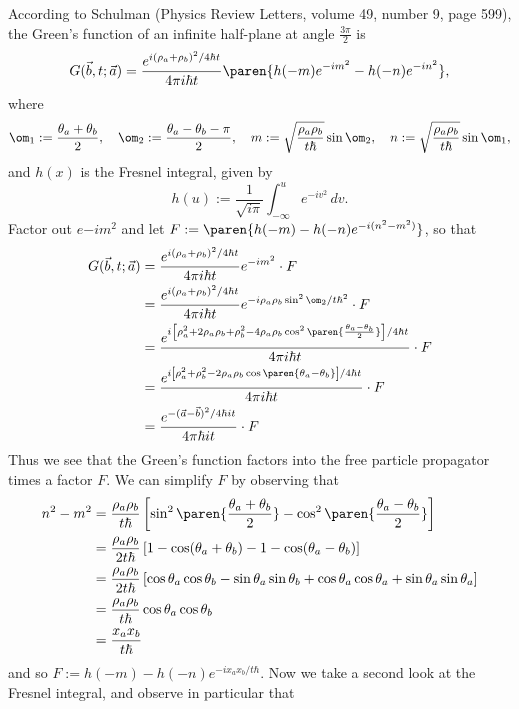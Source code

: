 \documentclass[onecolumn,amsmath,amssymb,nofootinbib,floatfix]{revtex4}
\begin{document}
According to Schulman (Physics Review Letters, volume 49, number 9, page 599), the Green's function of an infinite half-plane at angle $\frac{3\pi}{2}$ is
$$G(\vec{b},t;\vec{a}) = \frac{e^{i(\rho_a+\rho_b)^2/4\hbar t}}{4\pi i \hbar t}\paren{h(-m)e^{-im^2} - h(-n)e^{-in^2}},$$
where
$$\om_1 := \frac{\theta_a+\theta_b}{2}, \quad \om_2 := \frac{\theta_a - \theta_b - \pi}{2}, \quad m := \sqrt{\frac{\rho_a\rho_b}{t\hbar}}\sin \om_2, \quad n :=\sqrt{\frac{\rho_a\rho_b}{t\hbar}}\sin \om_1,$$
and $h(x)$ is the Fresnel integral, given by
$$h(u) := \frac{1}{\sqrt{i\pi}} \int_{-\infty}^{u} e^{-iv^2}\,dv.$$
Factor out $e{-im^2}$ and let $F:= \paren{h(-m) - h(-n)e^{-i(n^2-m^2)}}$, so that
$$
\begin{aligned}
G(\vec{b},t;\vec{a})
&= \frac{e^{i(\rho_a+\rho_b)^2/4\hbar t}}{4\pi i \hbar t}e^{-im^2}\cdot F \\
&= \frac{e^{i(\rho_a+\rho_b)^2/4\hbar t}}{4\pi i \hbar t}e^{-i\rho_a\rho_b\sin^2\om_2/t\hbar^2}\cdot F \\
&= \frac{e^{i\left[\rho_a^2+2\rho_a\rho_b+\rho_b^2-4\rho_a\rho_b\cos^2\paren{\frac{\theta_a-\theta_b}{2}}\right]/4\hbar t}}{4\pi i \hbar t}\cdot F \\
&= \frac{e^{i\left[\rho_a^2+\rho_b^2-2\rho_a\rho_b\cos\paren{\theta_a-\theta_b}\right]/4\hbar t}}{4\pi i \hbar t}\cdot F \\
&= \frac{e^{-(\vec{a}-\vec{b})^2/4\hbar it}}{4\pi \hbar it}\cdot F \\
\end{aligned}
$$
Thus we see that the Green's function factors into the free particle propagator times a factor $F$.  We can simplify $F$ by observing that
$$
\begin{aligned}
n^2-m^2
&= \frac{\rho_a\rho_b}{t\hbar}\left[\sin^2\paren{\frac{\theta_a+\theta_b}{2}} - \cos^2\paren{\frac{\theta_a-\theta_b}{2}}\right] \\
&= \frac{\rho_a\rho_b}{2t\hbar}\left[1-\cos(\theta_a+\theta_b)-1-\cos(\theta_a-\theta_b)\right] \\
&= \frac{\rho_a\rho_b}{2t\hbar}\left[\cos\theta_a\cos\theta_b - \sin\theta_a\sin\theta_b + \cos\theta_a\cos\theta_a + \sin\theta_a\sin\theta_a\right] \\
&= \frac{\rho_a\rho_b}{t\hbar}\cos\theta_a\cos\theta_b \\
&= \frac{x_a x_b}{t\hbar}\\
\end{aligned}
$$
and so
$F := h(-m)-h(-n)e^{-ix_a x_b/t\hbar}.$
Now we take a second look at the Fresnel integral, and observe in particular that
\end{document}
